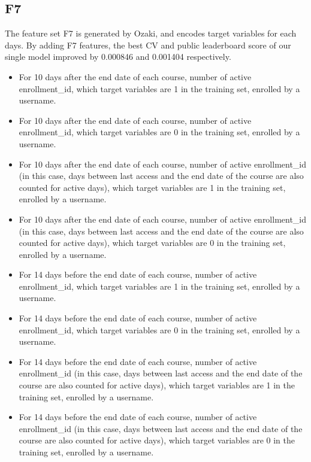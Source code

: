 \subsection{F7}

The feature set F7 is generated by Ozaki, and encodes target variables for each days.  By adding F7 features, the best CV and public leaderboard score of our single model improved by 0.000846 and 0.001404 respectively. 

\begin{itemize}
  \setlength\itemsep{0em}
  \item For 10 days after the end date of each course, number of active enrollment\_id, which target variables are 1 in the training set, enrolled by a username.
  \item For 10 days after the end date of each course, number of active enrollment\_id, which target variables are 0 in the training set, enrolled by a username.
  \item For 10 days after the end date of each course, number of active enrollment\_id (in this case, days between last access and the end date of the course are also counted for active days), which target variables are 1 in the training set, enrolled by a username.
  \item For 10 days after the end date of each course, number of active enrollment\_id (in this case, days between last access and the end date of the course are also counted for active days), which target variables are 0 in the training set, enrolled by a username.
  \item For 14 days before the end date of each course, number of active enrollment\_id, which target variables are 1 in the training set, enrolled by a username.
  \item For 14 days before the end date of each course, number of active enrollment\_id, which target variables are 0 in the training set, enrolled by a username.
  \item For 14 days before the end date of each course, number of active enrollment\_id (in this case, days between last access and the end date of the course are also counted for active days), which target variables are 1 in the training set, enrolled by a username.
  \item For 14 days before the end date of each course, number of active enrollment\_id (in this case, days between last access and the end date of the course are also counted for active days), which target variables are 0 in the training set, enrolled by a username.
\end{itemize}

